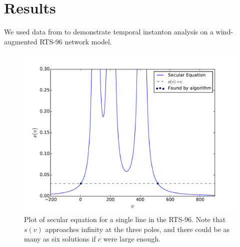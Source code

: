 \documentclass[journal,twoside]{IEEEtran}
\begin{document}
\section{Results}\label{sec:results}
We used data from \cite{pandzic} to demonstrate temporal instanton
analysis on a wind-augmented RTS-96 network model. 


\begin{figure}[t]
\centering
\includegraphics[trim=0in 0in 0.5in 0.5in,clip,width=1\linewidth]{images/secular}
\caption{Plot of secular equation for a single line in the RTS-96. Note that $s(v)$ approaches infinity at the three poles, and there could be as many as six solutions if $c$ were large enough.}
\label{fig:secular}
\end{figure}
\end{document}
